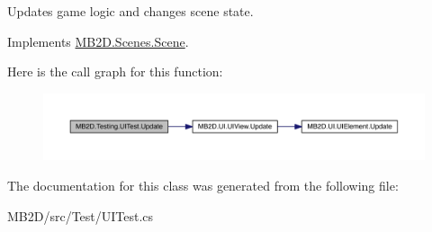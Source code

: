 Updates game logic and changes scene state. 



Implements \hyperlink{class_m_b2_d_1_1_scenes_1_1_scene_a779de7c1ab23b698dcde3a228324a991}{M\+B2\+D.\+Scenes.\+Scene}.

Here is the call graph for this function\+:\nopagebreak
\begin{figure}[H]
\begin{center}
\leavevmode
\includegraphics[width=350pt]{class_m_b2_d_1_1_testing_1_1_u_i_test_a547d5592fee47d4c9354ee8f307c8813_cgraph}
\end{center}
\end{figure}


The documentation for this class was generated from the following file\+:\begin{DoxyCompactItemize}
\item 
M\+B2\+D/src/\+Test/U\+I\+Test.\+cs\end{DoxyCompactItemize}
